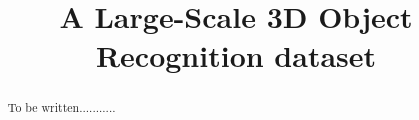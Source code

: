 \documentclass[10pt,twocolumn,letterpaper]{article}
\begin{document}
\title{A Large-Scale 3D Object Recognition dataset}


\maketitle

\begin{abstract}
 To be written...........
\end{abstract}

\end{document}
